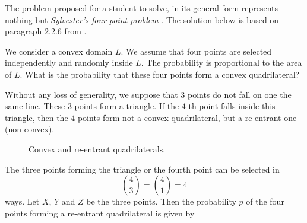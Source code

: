 \documentclass{article}
\begin{document}
The problem proposed for a student to solve, in its general form represents nothing but \textit{Sylvester's four point problem} \cite{sylvester}.
The solution below is based on paragraph 2.2.6 from \cite{geom}.

We consider a convex domain $L$.
We assume that four points are selected independently and randomly inside $L$.
The probability is proportional to the area of $L$.
What is the probability that these four points form a convex quadrilateral?

Without any loss of generality, we suppose that $3$ points do not fall on one the same line.
These $3$ points form a triangle.
If the $4$-th point falls inside this triangle, then the $4$ points form not a convex quadrilateral, but a re-entrant one (non-convex).
\begin{figure}[ht]
    \begin{minipage}[b]{.5\textwidth}
        \centering
    \end{minipage}
    \hspace{0.1cm}
    \begin{minipage}[b]{.4\textwidth}
        \centering
    \end{minipage}
    \caption{Convex and re-entrant quadrilaterals.}
\end{figure}
The three points forming the triangle or the fourth point can be selected in
\begin{equation}
    \binom{4}{3} = \binom{4}{1} = 4
\end{equation}
ways.
Let $X$, $Y$ and $Z$ be the three points.
Then the probability $p$ of the four points forming a re-entrant quadrilateral is given by
\end{document}

